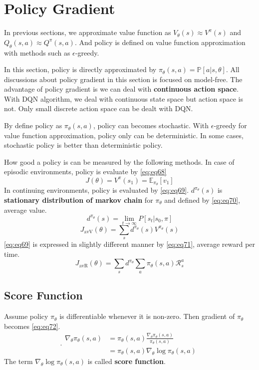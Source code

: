 \documentclass[
	10pt, %
]{article}
\theoremstyle{plain}
\newcommand{\mbb}[1]{\mathbb{#1}}
\newcommand{\mc}[1]{\mathcal{#1}}
\newcommand{\tb}[1]{\textbf{#1}}
\numberwithin{equation}{subsection} %
\begin{document}
\section{Policy Gradient}
In previous sections, we approximate value function as $V_\theta(s) \approx V^\pi(s)$ and $Q_\theta(s, a) \approx Q^\pi(s,a)$.
And policy is defined on value function approximation with methods such as $\epsilon$-greedy.

In this section, policy is directly approximated by $\pi_\theta(s,a) = \mbb{P}[a|s, \theta]$. All discussions about policy gradient in this section is focused on model-free.
The advantage of policy gradient is we can deal with \tb{continuous action space}. With DQN algorithm, we deal with continuous state space but action space is not. Only small discrete action space can be dealt with DQN.

By define policy as $\pi_\theta(s,a)$, policy can becomes stochastic.
With $\epsilon$-greedy for value function approximation, policy only can be deterministic.
In some cases, stochastic policy is better than deterministic policy.

How good a policy is can be measured by the following methods.
In case of episodic environments, policy is evaluate by \cref{eq:eq68}
\begin{equation} \label{eq:eq68}
    J(\theta) = V^\pi(s_1) = \mbb{E}_{\pi_\theta}[v_1]
\end{equation}
In continuing environments, policy is evaluated by \cref{eq:eq69}.
$d^{\pi_\theta}(s)$ is \tb{stationary distribution of markov chain} for $\pi_\theta$ and defined by \cref{eq:eq70}, average value.
\begin{equation} \label{eq:eq70}
    d^{\pi_\theta}(s) = \lim_{t \rightarrow \infty} P[s_t|s_0,\pi]
\end{equation}
\begin{equation} \label{eq:eq69}
    J_\text{avV}(\theta) = \sum_s d^{\pi_\theta}(s) V^{\pi_\theta}(s)
\end{equation}
\cref{eq:eq69} is expressed in slightly different manner by \cref{eq:eq71}, average reward per time.
\begin{equation} \label{eq:eq71}
    J_\text{avR}(\theta) = \sum_s d^{\pi_\theta} \sum_a \pi_\theta(s,a)\mc{R}^a_s
\end{equation}


\subsection{Score Function}
Assume policy $\pi_\theta$ is differentiable whenever it is non-zero. 
Then gradient of $\pi_\theta$ becomes \cref{eq:eq72}.
\begin{equation} \label{eq:eq72}.
    \begin{aligned}
        \nabla_\theta \pi_\theta (s,a) &= \pi_\theta(s,a) \frac{\nabla_\theta \pi_\theta(s,a)}{\pi_\theta(s,a)}\\
        &= \pi_\theta(s,a) \nabla_\theta \log \pi_\theta(s,a)
    \end{aligned}
\end{equation}
The term $\nabla_\theta \log \pi_\theta (s,a)$ is called \tb{score function}.
\end{document}
